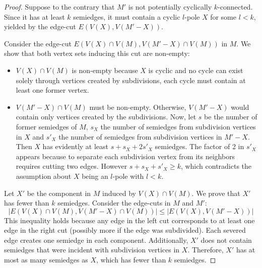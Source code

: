 \documentclass[12pt, twoside]{book}
\begin{document}
\begin{proof}
	
	
	Suppose to the contrary that $M'$ is not potentially cyclically $k$-connected. Since it has at least $k$ semiedges, it must contain a cyclic $l$-pole $X$ for some $l<k$, yielded by the edge-cut $E\left(V(X),V(M'-X)\right)$.
	
	Consider the edge-cut $E\left(V(X)\cap V(M), V(M'-X)\cap V(M)\right)$ in $M$. We show that both vertex sets inducing this cut are non-empty:
	\begin{itemize}
		\item $V(X)\cap V(M)$ is non-empty because $X$ is cyclic and no cycle can exist solely through vertices created by subdivisions, each cycle must contain at least one former vertex.
		\item $V(M'-X)\cap V(M)$ must be non-empty. Otherwise, $V(M'-X)$ would contain only vertices created by the subdivisions. Now, let $s$ be the number of former semiedges of $M$, $s_X$ the number of semiedges from subdivision vertices in $X$ and $s'_X$ the number of semiedges from subdivision vertices in $M'-X$. Then $X$ has evidently at least $s+s_X+2s'_X$ semiedges. The factor of 2 in $s'_X$ appears because to separate each subdivision vertex from its neighbors requires cutting two edges. However $s+s_X+s'_X\geq k$, which contradicts the assumption about $X$ being an $l$-pole with $l<k$.
	\end{itemize}
	
	Let $X'$ be the component in $M$ induced by $V(X)\cap V(M)$. We prove that $X'$ has fewer than $k$ semiedges. Consider the edge-cuts in $M$ and $M'$:
	$$\left|E\left(V(X)\cap V(M), V(M'-X)\cap V(M)\right)\right|\leq \left|E\left(V(X),V(M'-X)\right)\right|$$
	This inequality holds because any edge in the left cut corresponds to at least one edge in the right cut (possibly more if the edge was subdivided). Each severed edge creates one semiedge in each component. Additionally, $X'$ does not contain semiedges that were incident with subdivision vertices in $X$. Therefore, $X'$ has at most as many semiedges as $X$, which has fewer than $k$ semiedges.
	
	

\end{proof}
\end{document}

